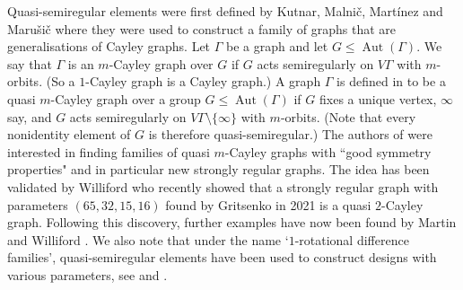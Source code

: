 \documentclass{article}
\theoremstyle{remark}
\theoremstyle{definition}
\DeclareMathOperator{\Aut}{Aut}
\newcommand{\qsres}{quasi-semiregular elements}
\begin{document}
Quasi-semiregular elements were first defined by Kutnar, Malni\v{c}, Mart\'{i}nez and Maru\v{s}i\v{c}  \cite{KMMM2013} where they were used to construct a family of graphs that are generalisations of Cayley graphs. Let $\Gamma$ be a graph and let $G\leqslant \Aut(\Gamma)$. We say that $\Gamma$ is an $m$-Cayley graph over $G$ if $G$ acts semiregularly on $V\Gamma$ with $m$-orbits. (So a $1$-Cayley graph is a Cayley graph.)  A graph $\Gamma$ is defined in \cite{KMMM2013} to be a quasi $m$-Cayley graph over a group $G  \leqslant \Aut(\Gamma)$ if $G$ fixes a unique vertex, $\infty$ say, and $G$ acts semiregularly on $V\Gamma\setminus\{\infty\}$ with $m$-orbits. (Note that every nonidentity element of $G$ is  therefore quasi-semiregular.) The authors of \cite{KMMM2013} were interested in finding  families of quasi $m$-Cayley graphs with ``good symmetry properties" and in particular   new strongly regular graphs. The idea has been validated by Williford \cite{Williford} who recently showed that a strongly regular graph with parameters $(65, 32, 15, 16)$ found by Gritsenko \cite{Gritsenko} in 2021 is a quasi $2$-Cayley  graph. Following this discovery, further examples have now been found by Martin and Williford \cite{Martin}.    We also note that under the name `$1$-rotational difference families', {\qsres} have been used to construct designs with various parameters, see \cite[\S16.6]{HCD} and \cite{Burattietal2025}.
\end{document}
